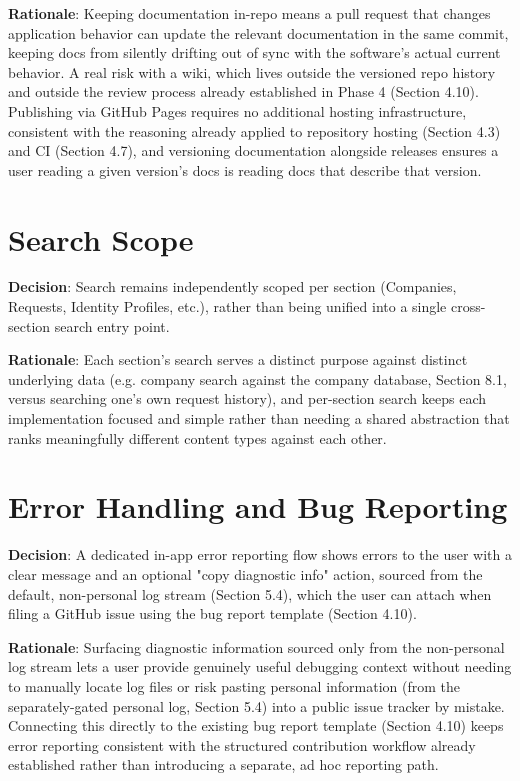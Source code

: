 \textbf{Rationale}: Keeping documentation in-repo means a pull request that changes application behavior can update the relevant documentation in the same commit, keeping docs from silently drifting out of sync with the software's actual current behavior. A real risk with a wiki, which lives outside the versioned repo history and outside the review process already established in Phase 4 (Section 4.10). Publishing via GitHub Pages requires no additional hosting infrastructure, consistent with the reasoning already applied to repository hosting (Section 4.3) and CI (Section 4.7), and versioning documentation alongside releases ensures a user reading a given version's docs is reading docs that describe that version.
\section{Search Scope}
\textbf{Decision}: Search remains independently scoped per section (Companies, Requests, Identity Profiles, etc.), rather than being unified into a single cross-section search entry point.

\textbf{Rationale}: Each section's search serves a distinct purpose against distinct underlying data (e.g. company search against the company database, Section 8.1, versus searching one's own request history), and per-section search keeps each implementation focused and simple rather than needing a shared abstraction that ranks meaningfully different content types against each other.
\section{Error Handling and Bug Reporting}
\textbf{Decision}: A dedicated in-app error reporting flow shows errors to the user with a clear message and an optional "copy diagnostic info" action, sourced from the default, non-personal log stream (Section 5.4), which the user can attach when filing a GitHub issue using the bug report template (Section 4.10).

\textbf{Rationale}: Surfacing diagnostic information sourced only from the non-personal log stream lets a user provide genuinely useful debugging context without needing to manually locate log files or risk pasting personal information (from the separately-gated personal log, Section 5.4) into a public issue tracker by mistake. Connecting this directly to the existing bug report template (Section 4.10) keeps error reporting consistent with the structured contribution workflow already established rather than introducing a separate, ad hoc reporting path.


\sentinelchapterend